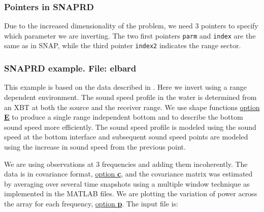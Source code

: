 \documentclass{saclantc}
\begin{document}
\subsubsection{Pointers in SNAPRD}
Due to the increased dimensionality of the problem, we need 3 pointers to specify
which parameter we are inverting. The two first pointers {\tt parm} and
{\tt index} are the same as in
{\sf SNAP}, while the third pointer {\tt index2} indicates the range sector.

\subsubsection{SNAPRD example. File: {\bf elbard}}
\label{se:elbard}
This example is based on the data described in 
\cite{gingras:asa95,gerstoft:asa96}. Here we
invert using a  range dependent environment. The sound speed profile in the water
is determined from an XBT at both the source and the receiver range. We use shape
functions \underline{option {\bf E}} to produce a single range independent
bottom and to describe the bottom sound speed more efficiently.
The sound speed profile is modeled using the sound speed at the bottom
interface and subsequent sound speed points are modeled using the
increase in sound speed from the previous point.

We are using observations at
3 frequencies and adding them incoherently. The data is in
covariance format, \underline{option {\bf c}}, and the
covariance matrix was estimated by averaging over several time
snapshots using a multiple window technique \cite{thompson:icassp94,meckl:icassp95} as implemented in
the MATLAB files. 
We are plotting the
variation of power across the array for each frequency,
 \underline{option {\bf p}}. The input file is:
\end{document}
